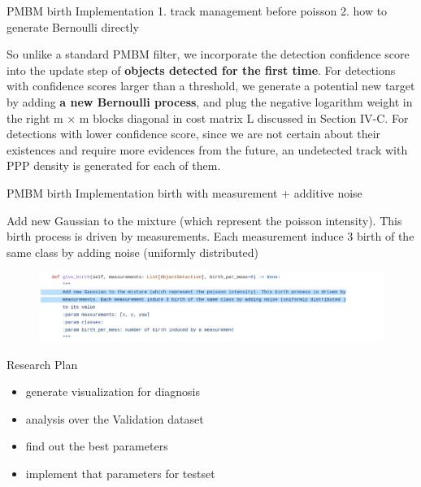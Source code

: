 \documentclass[aspectratio=169,xcolor=dvipsnames]{beamer}
\begin{document}
\begin{frame}{PMBM birth Implementation}
    1. track management before poisson
    2. how to generate Bernoulli directly
    \begin{block}{}
    So unlike a standard PMBM filter, we incorporate the detection confidence score into the update step 
    of \textbf{objects detected for the first time}. 
    For detections with confidence scores larger than a threshold, 
    we generate a potential new target by adding \textbf{a new Bernoulli process}, 
    and plug the negative logarithm weight in the right m × m blocks diagonal in cost matrix L 
    discussed in Section IV-C. For detections with lower confidence score, 
    since we are not certain about their existences and require more evidences from the future, 
    an undetected track with PPP density is generated for each of them.
    \href{https://www.researchgate.net/publication/355428771_3D_Multi-Object_Tracking_using_Random_Finite_Set-based_Multiple_Measurement_Models_Filtering_RFS-M_3_for_Autonomous_Vehicles}{}
    \end{block}
\end{frame}

\begin{frame}{PMBM birth Implementation}
    birth with measurement + additive noise
    \begin{block}{}
    Add new Gaussian to the mixture (which represent the poisson intensity). This birth process is driven by
    measurements. Each measurement induce 3 birth of the same class by adding noise (uniformly distributed)
    \href{https://github.com/quan-dao/pmbm-filter/blob/5cdf8b31665f1a7008afa963c1ab7c3b048b5856/poisson.py}{}
    \end{block}
    \begin{figure}
        \includegraphics[width=0.9\linewidth]{pmbm/1.png}
    \end{figure}
\end{frame}

\begin{frame}{Research Plan}
    \begin{itemize}
        \item{generate visualization for diagnosis}
        \item{analysis over the Validation dataset}
        \item{find out the best parameters}
        \item{implement that parameters for testset}
    \end{itemize}
\end{frame}
\end{document}
